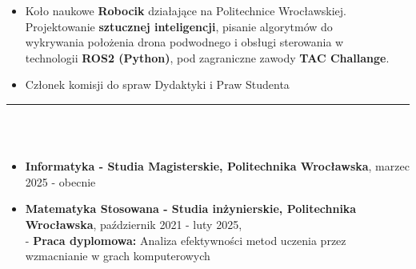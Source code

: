 \documentclass[10pt]{article}
\begin{document}
\begin{paracol}{2}
\begin{rightcolumn}
\begin{itemize}[leftmargin=*]
        \item Koło naukowe \textbf{Robocik} działające na Politechnice Wrocławskiej. \\
        Projektowanie \textbf{sztucznej inteligencji}, pisanie algorytmów do \\
        wykrywania położenia drona podwodnego i obsługi sterowania w \\ technologii \textbf{ROS2 (Python)},
        pod zagraniczne zawody \textbf{TAC Challange}.
        \item Członek komisji do spraw Dydaktyki i Praw Studenta
    \end{itemize}
    \rule{11cm}{1pt} \\ \\
    \fontsize{10pt}{10pt}
    \begin{itemize}[leftmargin=*]
        \setlength{\parskip}{0pt}
        \item \textbf{Informatyka - Studia Magisterskie, Politechnika Wrocławska}, marzec 2025 - obecnie
        \item \textbf{Matematyka Stosowana - Studia inżynierskie, Politechnika Wrocławska}, październik 2021 - luty 2025, \\
        - \textbf{Praca dyplomowa:} Analiza efektywności metod uczenia przez wzmacnianie w grach komputerowych

\end{itemize}
\end{rightcolumn}
\end{paracol}
\end{document}

